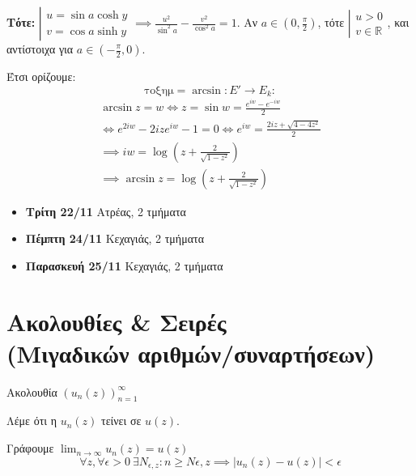 \documentclass[12pt,a4paper,titlepage,fleqn]{article}
\begin{document}
\begin{itemize}
\begin{itemize}
     	  	 \textbf{Τότε: } \( 
     	  	 \left|
     	  	 \begin{array}{l}
     	  	 u = \sin a \cosh y \\ v = \cos a \sinh y
     	  	 \end{array}
     	  	  \right. \implies \boxed{ \frac{u^2}{\sin^2 a} - \frac{v^2}{\cos^2 a} = 1 }
     	  	  \). Αν \( a \in \left( 0,\frac{\pi}{2} \right) \), τότε \( 
     	  	  \left| \begin{array}{l}
     	  	  u > 0 \\ v \in \mathbb R
     	  	  \end{array}  \right.
     	  	   \), και αντίστοιχα για \( a \in \left( -\frac{\pi}{2},0 \right) \).
     	  	   
     	  	   Έτσι ορίζουμε:
     	  	   \[
     	  	   \mathrm{τοξημ } = \arcsin: E' \to E_k:
     	  	   \]
     	  	   \begin{gather*}
     	  	   \arcsin z = w \iff z = \sin w = \frac{e^{iw}-e^{-iw}}{2} \\
     	  	   \iff e^{2iw}-2ize^{iw}-1 = 0 \iff e^{iw} = \frac{2iz+\sqrt{4-4z^2}}{2}
     	  	   \\ \implies iw = \log\left( z+\frac{2}{\sqrt{1-z^2}} \right) \\
     	  	   \implies \boxed{
     	  	   	\arcsin z = \log\left(
     	  	   	z+\frac{2}{\sqrt{1-z^2}}
     	  	   	\right)
     	  	   	}
     	  	   \end{gather*}
     	  \end{itemize}
     	  
     \end{itemize}
     
     \begin{infobox}{}
     	\begin{itemize}
     		\item \textbf{Τρίτη 22/11} Ατρέας, 2 τμήματα
     		\item \textbf{Πέμπτη 24/11} Κεχαγιάς, 2 τμήματα
     		\item \textbf{Παρασκευή 25/11} Κεχαγιάς, 2 τμήματα
     	\end{itemize}
     \end{infobox}
     
     \section{Ακολουθίες \& Σειρές\\(Μιγαδικών αριθμών/συναρτήσεων)}
     \begin{defn*}{}
     	Ακολουθία \(\displaystyle \left( u_n(z) \right)_{n=1}^\infty \)
     \end{defn*}
     \begin{defn*}{}
     	Λέμε ότι η \( u_n(z) \) τείνει σε \( u(z) \).
     	
     	Γράφουμε \( \displaystyle \lim_{n\to \infty} u_n(z)=u(z) \)
     	\[
     	\forall z,\forall\epsilon > 0 \ \exists N_{\epsilon,z}:
     	n \geq N{\epsilon,z} \implies \left| u_n(z)-u(z) \right|<\epsilon
     	\]
     \end{defn*}
\end{document}
